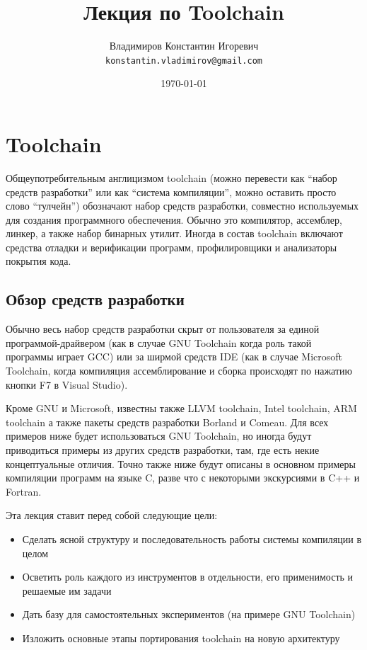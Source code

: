 \documentclass[a4paper,12pt,oneside]{article}
\title{Лекция по Toolchain}
\author{
  Владимиров Константин Игоревич\\
  \texttt{konstantin.vladimirov@gmail.com}
}
\date{\today}
\begin{document}
\tableofcontents

\pagebreak
\section{Toolchain}\label{sec:Toolchain}

Общеупотребительным англицизмом toolchain (можно перевести как ``набор средств разработки'' или как ``система компиляции'', можно оставить просто слово ``тулчейн'') обозначают набор средств разработки, совместно используемых для создания программного обеспечения. Обычно это компилятор, ассемблер, линкер, а также набор бинарных утилит. Иногда в состав toolchain включают средства отладки и верификации программ, профилировщики и анализаторы покрытия кода.

\subsection{Обзор средств разработки}\label{subsec:Overview}

Обычно весь набор средств разработки скрыт от пользователя за единой программой-драйвером (как в случае GNU Toolchain когда роль такой программы играет GCC) или за ширмой средств IDE (как в случае Microsoft Toolchain, когда компиляция ассемблирование и сборка происходят по нажатию кнопки F7 в Visual Studio).

Кроме GNU и Microsoft, известны также LLVM toolchain, Intel toolchain, ARM toolchain а также пакеты средств разработки Borland и Comeau. Для всех примеров ниже будет использоваться GNU Toolchain, но иногда будут приводиться примеры из других средств разработки, там, где есть некие концептуальные отличия. Точно также ниже будут описаны в основном примеры компиляции программ на языке C, разве что с некоторыми экскурсиями в C++ и Fortran.

Эта лекция ставит перед собой следующие цели:

\begin{itemize}
\item Сделать ясной структуру и последовательность работы системы компиляции в целом
\item Осветить роль каждого из инструментов в отдельности, его применимость и решаемые им задачи
\item Дать базу для самостоятельных экспериментов (на примере GNU Toolchain)
\item Изложить основные этапы портирования toolchain на новую архитектуру
\end{itemize}
\end{document}
